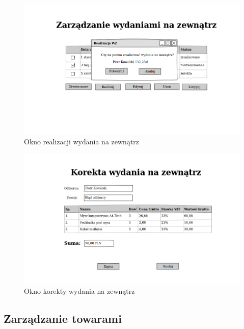 \begin{figure}[!htb]
  \begin{center}
    \includegraphics[scale=0.45]{../img/interfejs/realizacja-wydania-na-zewnatrz.png}
  \end{center}
  \caption{Okno realizacji wydania na zewnątrz}
\end{figure}
\FloatBarrier

\begin{figure}[!htb]
  \begin{center}
    \includegraphics[scale=0.45]{../img/interfejs/korekta-wydania-na-zewnatrz.png}
  \end{center}
  \caption{Okno korekty wydania na zewnątrz}
\end{figure}
\FloatBarrier

\subsection{Zarządzanie towarami}

